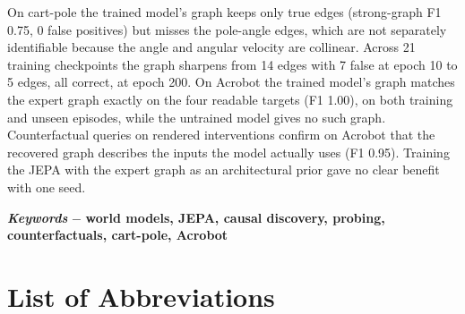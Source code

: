 \documentclass[11pt, a4paper, oneside,enumerate,textcomp]{report}
\begin{document}
On cart-pole the trained model's graph keeps only true edges (strong-graph F1 0.75, 0 false positives) but misses the pole-angle edges, which are not separately identifiable because the angle and angular velocity are collinear. Across 21 training checkpoints the graph sharpens from 14 edges with 7 false at epoch 10 to 5 edges, all correct, at epoch 200. On Acrobot the trained model's graph matches the expert graph exactly on the four readable targets (F1 1.00), on both training and unseen episodes, while the untrained model gives no such graph. Counterfactual queries on rendered interventions confirm on Acrobot that the recovered graph describes the inputs the model actually uses (F1 0.95). Training the JEPA with the expert graph as an architectural prior gave no clear benefit with one seed.

\vspace{2mm}

\hspace{-0.7cm}\textbf{\emph {Keywords}} $ - $ \textbf{world models, JEPA, causal discovery, probing, counterfactuals, cart-pole, Acrobot}


\tableofcontents
\listoffigures
{}
\listoftables
{}


\chapter*{List of Abbreviations}
\end{document}
